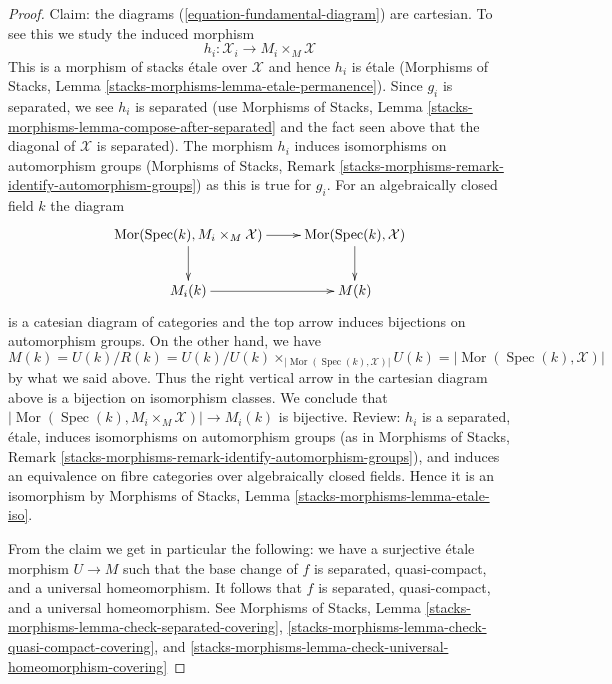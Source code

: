 \documentclass{stacks-project}
\theoremstyle{plain}
\theoremstyle{definition}
\theoremstyle{remark}
\numberwithin{equation}{subsection}
\def\Spec{\mathop{\mathrm{Spec}}}
\def\Mor{\mathop{\mathrm{Mor}}\nolimits}
\begin{document}
\begin{proof}
\medskip\noindent
Claim: the diagrams (\ref{equation-fundamental-diagram}) are cartesian.
To see this we study the induced morphism
$$
h_i : \mathcal{X}_i \longrightarrow M_i \times_M \mathcal{X}
$$
This is a morphism of stacks \'etale over $\mathcal{X}$
and hence $h_i$ is \'etale (Morphisms of Stacks, Lemma
\ref{stacks-morphisms-lemma-etale-permanence}).
Since $g_i$ is separated, we see $h_i$ is separated
(use Morphisms of Stacks, Lemma
\ref{stacks-morphisms-lemma-compose-after-separated} and the fact
seen above that the diagonal of $\mathcal{X}$ is separated).
The morphism $h_i$ induces isomorphisms on automorphism groups
(Morphisms of Stacks, Remark
\ref{stacks-morphisms-remark-identify-automorphism-groups})
as this is true for $g_i$. For an algebraically closed field $k$
the diagram
$$
\xymatrix{
\Mor(\Spec(k), M_i \times_M \mathcal{X}) \ar[r] \ar[d] &
\Mor(\Spec(k), \mathcal{X}) \ar[d] \\
M_i(k) \ar[r] &
M(k)
}
$$
is a catesian diagram of categories and the top arrow
induces bijections on automorphism groups.
On the other hand, we have
$$
M(k) = U(k)/R(k) = U(k)/
U(k) \times_{|\Mor(\Spec(k), \mathcal{X})|} U(k) =
|\Mor(\Spec(k), \mathcal{X})|
$$
by what we said above. Thus the right vertical arrow in the
cartesian diagram above is a bijection on isomorphism classes.
We conclude that
$|\Mor(\Spec(k), M_i \times_M \mathcal{X})| \to M_i(k)$ is bijective.
Review: $h_i$ is a separated, \'etale, induces isomorphisms on
automorphism groups (as in Morphisms of Stacks, Remark
\ref{stacks-morphisms-remark-identify-automorphism-groups}), and
induces an equivalence on fibre categories over algebraically closed fields.
Hence it is an isomorphism by Morphisms of Stacks, Lemma
\ref{stacks-morphisms-lemma-etale-iso}.

\medskip\noindent
From the claim we get in particular the following:
we have a surjective \'etale morphism $U \to M$
such that the base change of $f$ is separated, quasi-compact,
and a universal homeomorphism. It follows that $f$ is separated,
quasi-compact, and a universal homeomorphism.
See Morphisms of Stacks, Lemma
\ref{stacks-morphisms-lemma-check-separated-covering},
\ref{stacks-morphisms-lemma-check-quasi-compact-covering}, and
\ref{stacks-morphisms-lemma-check-universal-homeomorphism-covering}


\end{proof}
\end{document}
